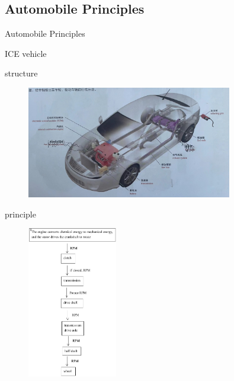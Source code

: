 \subsection{Automobile Principles}
\begin{frame}{Automobile Principles}
	\begin{block}{ICE vehicle}
		\begin{compactitem}
			\item structure
			\begin{figure}[htbp]
				\centering
				\includegraphics[width=0.8\textwidth]{1-14}
			\end{figure}
		\end{compactitem}
	\end{block}
\end{frame}
\begin{frame}
	\begin{block}{}
		\begin{compactitem}
			\item principle
			\begin{figure}[htbp]
				\centering
				\includegraphics[width=0.35\textwidth]{1-15}
			\end{figure}
		\end{compactitem}
	\end{block}
\end{frame}
